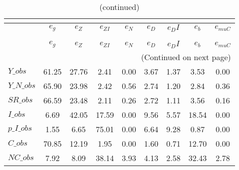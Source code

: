  
\begin{center}
\begin{longtable}{lcccccccc} 
\caption{VARIANCE DECOMPOSITION (in percent)}\\
 \label{Table:th_var_decomp_uncond}\\
\toprule 
$               $	 & 	 $        {e_g}$	 & 	 $        {e_Z}$	 & 	 $     {e_{ZI}}$	 & 	 $        {e_N}$	 & 	 $        {e_D}$	 & 	 $       {e_DI}$	 & 	 $        {e_b}$	 & 	 $    {e_{muC}}$\\
\midrule \endfirsthead 
\caption{(continued)}\\
 \toprule \\ 
$               $	 & 	 $        {e_g}$	 & 	 $        {e_Z}$	 & 	 $     {e_{ZI}}$	 & 	 $        {e_N}$	 & 	 $        {e_D}$	 & 	 $       {e_DI}$	 & 	 $        {e_b}$	 & 	 $    {e_{muC}}$\\
\midrule \endhead 
\midrule \multicolumn{9}{r}{(Continued on next page)} \\ \bottomrule \endfoot 
\bottomrule \endlastfoot 
$Y\_obs         $	 & 	        61.25	 & 	        27.76	 & 	         2.41	 & 	         0.00	 & 	         3.67	 & 	         1.37	 & 	         3.53	 & 	         0.00 \\ 
$Y\_N\_obs      $	 & 	        65.90	 & 	        23.98	 & 	         2.42	 & 	         0.56	 & 	         2.74	 & 	         1.20	 & 	         2.84	 & 	         0.36 \\ 
$SR\_obs        $	 & 	        66.59	 & 	        23.48	 & 	         2.11	 & 	         0.26	 & 	         2.72	 & 	         1.11	 & 	         3.56	 & 	         0.16 \\ 
$I\_obs         $	 & 	         6.69	 & 	        42.05	 & 	        17.59	 & 	         0.00	 & 	         9.56	 & 	         5.57	 & 	        18.54	 & 	         0.00 \\ 
$p\_I\_obs      $	 & 	         1.55	 & 	         6.65	 & 	        75.01	 & 	         0.00	 & 	         6.64	 & 	         9.28	 & 	         0.87	 & 	         0.00 \\ 
$C\_obs         $	 & 	        70.85	 & 	        12.19	 & 	         1.95	 & 	         0.00	 & 	         1.60	 & 	         0.71	 & 	        12.70	 & 	         0.00 \\ 
$NC\_obs        $	 & 	         7.92	 & 	         8.09	 & 	        38.14	 & 	         3.93	 & 	         4.13	 & 	         2.58	 & 	        32.43	 & 	         2.78 \\ 

\end{longtable}
\end{center}
